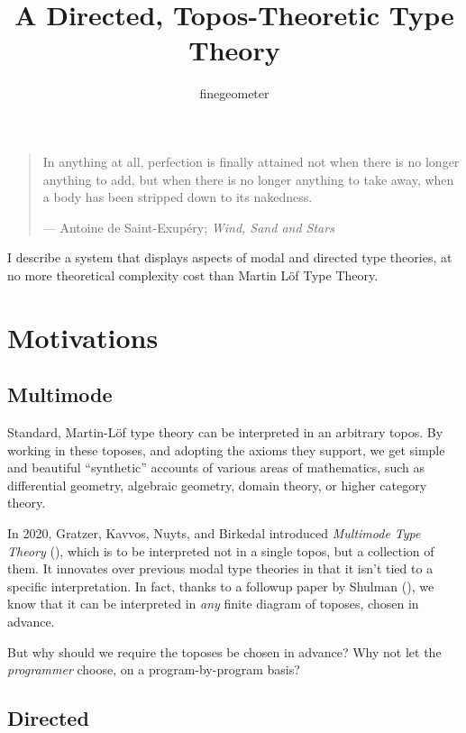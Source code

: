 \documentclass{article}
\title{A Directed, Topos-Theoretic Type Theory}
\author{finegeometer}
\begin{document}
\maketitle


\begin{quotation}
    In anything at all, perfection is finally attained not when there is no longer anything to add, but when there is no longer anything to take away, when a body has been stripped down to its nakedness.

    --- Antoine de Saint-Exupéry; \emph{Wind, Sand and Stars}
\end{quotation}

I describe a system that displays aspects of modal and directed type theories,
at no more theoretical complexity cost than Martin L\"of Type Theory.

\tableofcontents

\section{Motivations}

\subsection{Multimode}

Standard, Martin-L\"of type theory can be interpreted in an arbitrary topos.
By working in these toposes, and adopting the axioms they support,
we get simple and beautiful ``synthetic'' accounts of various areas of mathematics,
such as differential geometry, algebraic geometry, domain theory, or higher category theory. 

In 2020, Gratzer, Kavvos, Nuyts, and Birkedal introduced \emph{Multimode Type Theory} (\cite{MTT}),
which is to be interpreted not in a single topos, but a collection of them.
It innovates over previous modal type theories in that it isn't tied to a specific interpretation.
In fact, thanks to a followup paper by Shulman (\cite{MTT_Shulman}), we know that it can be interpreted
in \emph{any} finite diagram of toposes, chosen in advance.

But why should we require the toposes be chosen in advance?
Why not let the \emph{programmer} choose, on a program-by-program basis?

\subsection{Directed}
\end{document}
